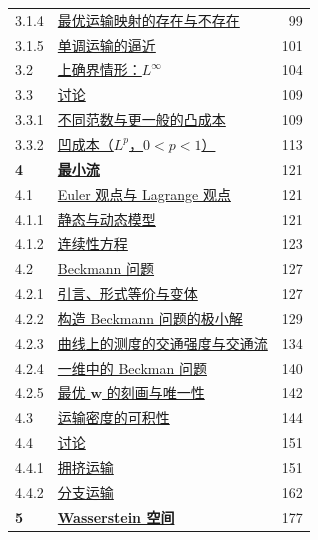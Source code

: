 \begin{longtable}{@{}p{1.4cm}p{11.2cm}r@{}}
3.1.4&\hyperref[sec:3.1.4]{\hspace{1em}最优运输映射的存在与不存在}&99\\
3.1.5&\hyperref[sec:3.1.5]{\hspace{1em}单调运输的逼近}&101\\
3.2&\hyperref[sec:3.2]{上确界情形：$L^\infty$}&104\\
3.3&\hyperref[sec:3.3]{讨论}&109\\
3.3.1&\hyperref[sec:3.3.1]{\hspace{1em}不同范数与更一般的凸成本}&109\\
3.3.2&\hyperref[sec:3.3.2]{\hspace{1em}凹成本（$L^p$，$0<p<1$）}&113\\
\textbf{4}&\hyperref[sec:4]{\textbf{最小流}}&121\\
4.1&\hyperref[sec:4.1]{Euler 观点与 Lagrange 观点}&121\\
4.1.1&\hyperref[sec:4.1.1]{\hspace{1em}静态与动态模型}&121\\
4.1.2&\hyperref[sec:4.1.2]{\hspace{1em}连续性方程}&123\\
4.2&\hyperref[sec:4.2]{Beckmann 问题}&127\\
4.2.1&\hyperref[sec:4.2.1]{\hspace{1em}引言、形式等价与变体}&127\\
4.2.2&\hyperref[sec:4.2.2]{\hspace{1em}构造 Beckmann 问题的极小解}&129\\
4.2.3&\hyperref[sec:4.2.3]{\hspace{1em}曲线上的测度的交通强度与交通流}&134\\
4.2.4&\hyperref[sec:4.2.4]{\hspace{1em}一维中的 Beckman 问题}&140\\
4.2.5&\hyperref[sec:4.2.5]{\hspace{1em}最优 $\mathbf w$ 的刻画与唯一性}&142\\
4.3&\hyperref[sec:4.3]{运输密度的可积性}&144\\
4.4&\hyperref[sec:4.4]{讨论}&151\\
4.4.1&\hyperref[sec:4.4.1]{\hspace{1em}拥挤运输}&151\\
4.4.2&\hyperref[sec:4.4.2]{\hspace{1em}分支运输}&162\\
\textbf{5}&\hyperref[sec:5]{\textbf{Wasserstein 空间}}&177\\

\end{longtable}
